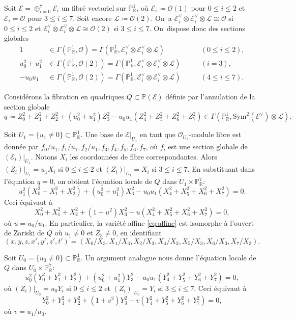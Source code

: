\documentclass[11pt]{article}
\theoremstyle{definition}
\newcommand{\R}{\mathbb R}
\renewcommand{\P}{\mathbb P}
\newcommand{\mc}[1]{\mathcal{#1}}
\begin{document}
Soit $\mc{E}=\oplus_{i=0}^7\mc{E}_i$ un fibré vectoriel sur $\P^1_\R$, où $\mc{E}_i\coloneqq \mc{O}(1)$ pour $0\leq i\leq 2$ et $\mc{E}_i=\mc{O}$ pour $3\leq i\leq 7$. Soit encore $\mc{L}\coloneqq \mc{O}(2)$. On~a $\mc{E}_i^\vee\otimes \mc{E}_i^\vee\otimes \mc{L}\cong \mc{O}$ si $0\leq i\leq 2$ et $\mc{E}_i^\vee\otimes \mc{E}_i^\vee\otimes \mc{L}\cong \mc{O}(2)$ si $3\leq i\leq 7$. On~dispose donc des sections globales
\begin{align*}
1&\in \Gamma(\P^1_\R,\mc{O})=\Gamma(\P^1_\R, \mc{E}_i^\vee\otimes \mc{E}_i^\vee\otimes \mc{L})\qquad &(0\leq i\leq 2), \\
u_0^2+u_1^2&\in \Gamma(\P^1_\R,\mc{O}(2))=\Gamma(\P^1_\R, \mc{E}_i^\vee\otimes \mc{E}_i^\vee\otimes \mc{L})\qquad &(i=3),\\
-u_0u_1& \in \Gamma(\P^1_\R,\mc{O}(2))=\Gamma(\P^1_\R, \mc{E}_i^\vee\otimes \mc{E}_i^\vee\otimes \mc{L})\qquad &(4\leq i\leq 7).
\end{align*}

Considérons la fibration en quadriques $Q \subset \P(\mc{E})$ définie par l'annulation de la section globale
\[
q \coloneqq Z_0^2 + Z_1^2 + Z_2^2 + (u_0^2+u_1^2)Z_3^2 - u_0u_1(Z_4^2 + Z_5^2 + Z_6^2 + Z_7^2)\in \Gamma(\P^1_\R,\mathrm{Sym}^2(\mc{E}^\vee) \otimes \mc{L}).
\]

Soit $U_1=\{u_1\neq 0\}\subset \P^1_\R$. Une base de $\mc{E}|_{U_1}$ en tant que $\mc{O}_{U_1}$-module libre est donnée par $f_0/u_1, f_1/u_1, f_2/u_1, f_3, f_4, f_5, f_6, f_7$, où $f_i$ est une section globale de $(\mc{E}_i)|_{U_1}$. Notons $X_i$ les coordonnées de fibre correspondantes. Alors $(Z_i)|_{U_1}=u_1X_i$ si $0\leq i\leq 2$ et $(Z_i)|_{U_1}=X_i$ si $3\leq i\leq 7$.
En substituant dans l'équation $q=0$, on obtient l'équation locale de $Q$ dans $U_1 \times \P^7_\R$:
\[
u_1^2(X_0^2+X_1^2+X_2^2) + (u_0^2+u_1^2)X_3^2 - u_0u_1(X_4^2+X_5^2+X_6^2+X_7^2) = 0.
\]
Ceci équivaut à
\begin{equation} \label{eq:local_S}
X_0^2+X_1^2+X_2^2 + (1+u^2)X_3^2 - u(X_4^2+X_5^2+X_6^2+X_7^2) = 0,
\end{equation}
où $u=u_0/u_1$. En particulier, la variété affine \eqref{eq:affine} est isomorphe à l'ouvert de Zariski de $Q$ où $u_1\neq 0$ et $Z_3\neq 0$, en identifiant
\[(x,y,z,x',y',z',t')=(X_0/X_3,X_1/X_3,X_2/X_3,X_4/X_3,X_5/X_3,X_6/X_3,X_7/X_3).\]

Soit $U_0=\{u_0\neq 0\}\subset \P^1_\R$. Un argument analogue nous donne l'équation locale de~$Q$ dans $U_0 \times \P^7_\R$:
\[
u_0^2(Y_0^2+Y_1^2+Y_2^2) + (u_0^2+u_1^2)Y_3^2 - u_0u_1(Y_4^2+Y_5^2+Y_6^2+Y_7^2) = 0,
\]
où $(Z_i)|_{U_0}=u_0Y_i$ si $0\leq i\leq 2$ et $(Z_i)|_{U_0}=Y_i$ si $3\leq i\leq 7$.
Ceci équivaut à
\begin{equation} \label{eq:local_T}
Y_0^2+Y_1^2+Y_2^2 + (1+v^2)Y_3^2 - v(Y_4^2+Y_5^2+Y_6^2+Y_7^2) = 0,
\end{equation}
où $v=u_1/u_0$.
\end{document}
